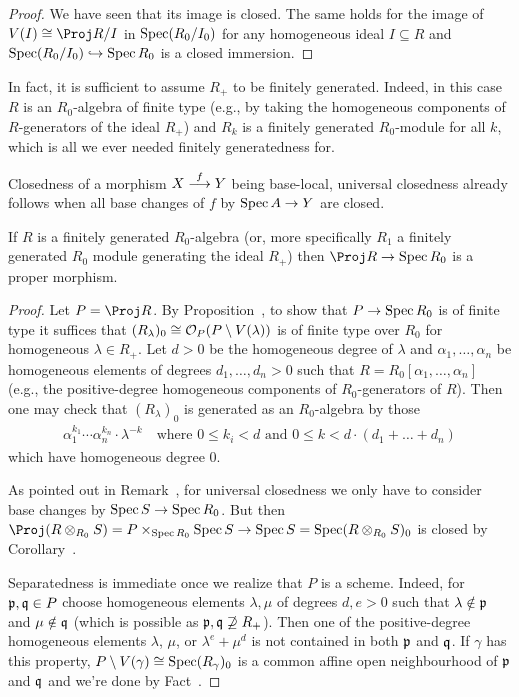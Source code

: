 \documentclass[a4paper,parskip=half,numbers=enddot, DIV=12]{scrreprt}
\begin{document}
\begin{proof}
    We have seen that its image is closed. The same holds for the image of $V(I) \cong \Proj R/I$ in $\operatorname{Spec} (R_0/I_0)$ for any homogeneous ideal $I\subseteq R$ and $\Spec (R_0/I_0)\monomorphism \Spec R_0$ is a closed immersion.
\end{proof}
\begin{rem}
    In fact, it is sufficient to assume $R_+$ to be finitely generated. Indeed, in this case $R$ is an $R_0$-algebra of finite type (e.g., by taking the homogeneous components of $R$-generators of the ideal $R_+$) and $R_k$ is a finitely generated $R_0$-module for all $k$, which is all we ever needed finitely generatedness for.
\end{rem}
\begin{rem}
    Closedness of a morphism $X\morphism[f] Y$ being base-local, universal closedness already follows when all base changes of $f$ by $\Spec A \morphism Y$ are closed.
\end{rem}
\begin{cor}
    If $R$ is a finitely generated $R_0$-algebra (or, more specifically $R_1$ a finitely generated $R_0$ module generating the ideal $R_+$) then $\Proj R\morphism \Spec R_0$ is a proper morphism.
\end{cor}
\begin{proof}
	Let $P=\Proj R$. By Proposition~, to show that $P\morphism\Spec R_0$ is of finite type it suffices that $(R_\lambda)_0\cong \mathcal{O}_P(P\setminus V(\lambda))$ is of finite type over $R_0$ for homogeneous $\lambda\in R_+$. Let $d>0$ be the homogeneous degree of $\lambda$ and  $\alpha_1,\ldots,\alpha_n$ be homogeneous elements of degrees $d_1,\ldots,d_n>0$ such that $R=R_0[\alpha_1,\ldots,\alpha_n]$ (e.g., the positive-degree homogeneous components of $R_0$-generators of $R$). Then one may check that $(R_\lambda)_0$ is generated as an $R_0$-algebra by those
	\begin{align*}
		\alpha_1^{k_1}\cdots \alpha_n^{k_n}\cdot\lambda^{-k}\quad\text{where }0\leq k_i<d\text{ and }0\leq k<d\cdot(d_1+\ldots+d_n)
	\end{align*}
	which have homogeneous degree $0$.
	
	As pointed out in Remark~, for universal closedness we only have to consider base changes by $\Spec S\morphism\Spec R_0$. But then $\Proj(R\otimes_{R_0}S)=P\times_{\Spec R_0}\Spec S\morphism\Spec S=\Spec (R\otimes_{R_0}S)_0$ is closed by Corollary~.
	
	Separatedness is immediate once we realize that $P$ is a scheme. Indeed, for $\mathfrak{p},\mathfrak{q}\in P$ choose homogeneous elements $\lambda,\mu$ of degrees $d,e>0$ such that $\lambda\notin\mathfrak{p}$ and $\mu\notin\mathfrak{q}$ (which is possible as $\mathfrak{p},\mathfrak{q}\not\supseteq R_+$). Then one of the positive-degree homogeneous elements $\lambda$, $\mu$, or $\lambda^e+\mu^d$ is not contained in both $\mathfrak{p}$ and $\mathfrak{q}$. If $\gamma$ has this property, $P\setminus V(\gamma)\cong \operatorname{Spec} (R_\gamma)_0$ is a common affine open neighbourhood of $\mathfrak{p}$ and $\mathfrak{q}$ and we're done by Fact~.
\end{proof}
\end{document}
